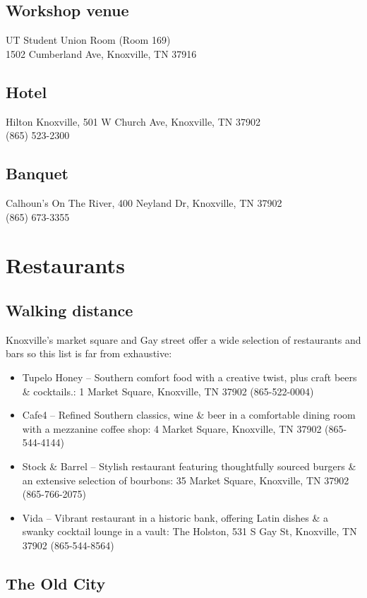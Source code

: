 \documentclass[12pt,letterpaper]{book}
\begin{document}
\subsection*{Workshop venue}
UT Student Union Room (Room 169)\\1502 Cumberland Ave, Knoxville, TN 37916
\subsection*{Hotel}
Hilton Knoxville, 501 W Church Ave, Knoxville, TN 37902 \\
(865) 523-2300
\subsection*{Banquet}
Calhoun's On The River, 400 Neyland Dr, Knoxville, TN 37902 \\
(865) 673-3355

\section{Restaurants}

\subsection*{Walking distance}

Knoxville's market square and Gay street offer a wide selection of restaurants and bars so this list is far from exhaustive:

\begin{itemize}
\item Tupelo Honey -- Southern comfort food with a creative twist, plus craft beers \& cocktails.: 1 Market Square, Knoxville, TN 37902 (865-522-0004)
\item Cafe4 -- Refined Southern classics, wine \& beer in a comfortable dining room with a mezzanine coffee shop: 4 Market Square, Knoxville, TN 37902 (865-544-4144)
\item Stock \& Barrel -- Stylish restaurant featuring thoughtfully sourced burgers \& an extensive selection of bourbons: 35 Market Square, Knoxville, TN 37902 (865-766-2075)
\item Vida -- Vibrant restaurant in a historic bank, offering Latin dishes \& a swanky cocktail lounge in a vault: The Holston, 531 S Gay St, Knoxville, TN 37902 (865-544-8564)
\end{itemize}

\subsection*{The Old City}
\end{document}
